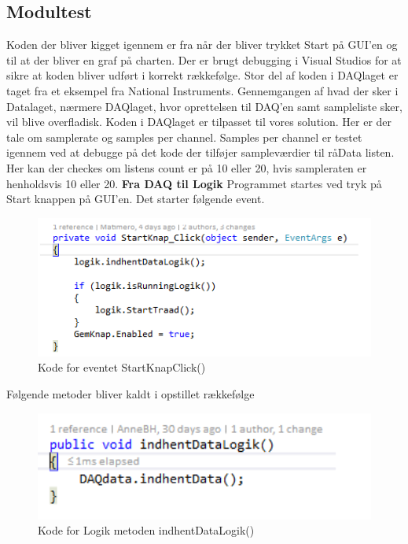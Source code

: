 \subsection{Modultest}
Koden der bliver kigget igennem er fra når der bliver trykket Start på GUI'en og til at der bliver en graf på charten. Der er brugt debugging i Visual Studios for at sikre at koden bliver udført i korrekt rækkefølge. Stor del af koden i DAQlaget er taget fra et eksempel fra National Instruments. Gennemgangen af hvad der sker i Datalaget, nærmere DAQlaget, hvor oprettelsen til DAQ’en samt sampleliste sker, vil blive overfladisk. Koden i DAQlaget er tilpasset til vores solution. Her er der tale om samplerate og samples per channel. Samples per channel er testet igennem ved at debugge på det kode der tilføjer sampleværdier til råData listen. Her kan der checkes om listens count er på 10 eller 20, hvis sampleraten er henholdsvis 10 eller 20.
\textbf{Fra DAQ til Logik}
Programmet startes ved tryk på Start knappen på GUI'en. Det starter følgende event.
\begin{figure}[H]
	\centering
	\includegraphics[width=1.0\textwidth]{FigurerProgram/StartKnap}
	\caption{Kode for eventet StartKnapClick()}
\end{figure}
Følgende metoder bliver kaldt i opstillet rækkefølge

\begin{figure}[H]
	\centering
	\includegraphics[width=1.0\textwidth]{FigurerProgram/IndhentDataLogik}
	\caption{Kode for Logik metoden indhentDataLogik()}
\end{figure}


